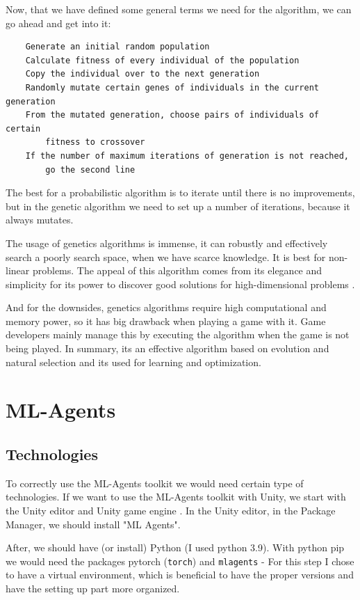 \documentclass[a4paper, 12pt]{book}
\begin{document}
Now, that we have defined some general terms we need for the algorithm, we can go ahead and get into it:

\begin{verbatim}
    Generate an initial random population
    Calculate fitness of every individual of the population
    Copy the individual over to the next generation
    Randomly mutate certain genes of individuals in the current generation
    From the mutated generation, choose pairs of individuals of certain 
        fitness to crossover
    If the number of maximum iterations of generation is not reached, 
        go the second line
\end{verbatim}

The best for a probabilistic algorithm is to iterate until there is no improvements, but in the genetic algorithm we need to set up a number of iterations, because it always mutates.

The usage of genetics algorithms is immense, it can robustly and effectively search a poorly search space, when we have scarce knowledge. It is best for non-linear problems. The appeal of this algorithm comes from its elegance and simplicity for its power to discover good solutions for high-dimensional problems \cite{CurrentAIGames}.

And for the downsides, genetics algorithms require high computational and memory power, so it has big drawback when playing a game with it. Game developers mainly manage this by executing the algorithm when the game is not being played. In summary, its an effective algorithm based on evolution and natural selection and its used for learning and optimization.

\chapter{ML-Agents}
\label{ch3}

\section{Technologies}

To correctly use the ML-Agents toolkit we would need certain type of technologies. If we want to use the ML-Agents toolkit with Unity, we start with the Unity editor and Unity game engine \cite{UnitySoftware}. In the Unity editor, in the Package Manager, we should install "ML Agents".

After, we should have (or install) Python \cite{PythonManual} (I used python 3.9). With python pip we would need the packages pytorch (\texttt{torch}) and \texttt{mlagents} - For this step I chose to have a virtual environment, which is beneficial to have the proper versions and have the setting up part more organized.
\end{document}
